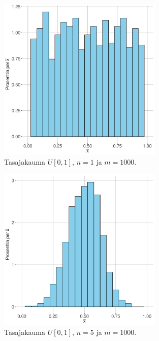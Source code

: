 \documentclass{beamer}
\begin{document}
\begin{frame}
  \begin{center}
    \begin{figure}
      \includegraphics[width=0.7\textwidth, height=0.7\textwidth]{unif-n-1.pdf}
      \caption{Tasajakauma $U[0,1]$, $n = 1$ ja $m = 1000$.}
    \end{figure}
  \end{center}
\end{frame}


\begin{frame}
  \begin{center}
    \begin{figure}
      \includegraphics[width=0.7\textwidth, height=0.7\textwidth]{unif-n-5.pdf}
      \caption{Tasajakauma $U[0,1]$, $n = 5$ ja $m = 1000$.}
    \end{figure}
  \end{center}
\end{frame}
\end{document}
